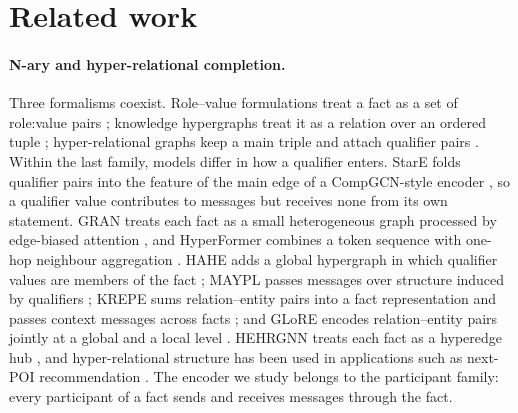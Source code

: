 \documentclass[11pt,a4paper]{article}
\begin{document}
\section{Related work}

\paragraph{N-ary and hyper-relational completion.}
Three formalisms coexist. Role--value formulations treat a fact as a set of role:value pairs \citep{guan2019nalp,guan2021relatedness}; knowledge hypergraphs treat it as a relation over an ordered tuple \citep{wen2016mtransh,fatemi2020hype}; hyper-relational graphs keep a main triple and attach qualifier pairs \citep{rosso2020hinge,galkin2020stare}. Within the last family, models differ in how a qualifier enters. StarE folds qualifier pairs into the feature of the main edge of a CompGCN-style encoder \citep{vashishth2020compgcn,galkin2020stare}, so a qualifier value contributes to messages but receives none from its own statement. GRAN treats each fact as a small heterogeneous graph processed by edge-biased attention \citep{wang2021gran}, and HyperFormer combines a token sequence with one-hop neighbour aggregation \citep{hu2023hyperformer}. HAHE adds a global hypergraph in which qualifier values are members of the fact \citep{luo2023hahe}; MAYPL passes messages over structure induced by qualifiers \citep{lee2025maypl}; KREPE sums relation--entity pairs into a fact representation and passes context messages across facts \citep{lee2026krepe}; and GLoRE encodes relation--entity pairs jointly at a global and a local level \citep{ji2026glore}. HEHRGNN treats each fact as a hyperedge hub \citep{rajagopalamenon2026hehrgnn}, and hyper-relational structure has been used in applications such as next-POI recommendation \citep{zhang2023hkgnn}. The encoder we study belongs to the participant family: every participant of a fact sends and receives messages through the fact.
\end{document}
